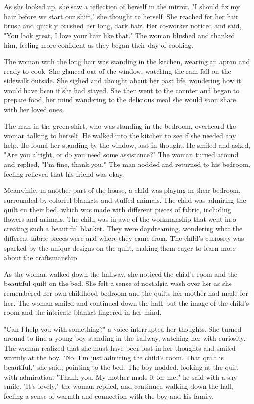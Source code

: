 \documentclass[smalldemyvopaper,11pt,twoside,onecolumn,openright,extrafontsizes]{memoir}
\begin{document}
As she looked up, she saw a reflection of herself in the mirror. "I should fix my hair before we start our shift," she thought to herself. She reached for her hair brush and quickly brushed her long, dark hair. Her co-worker noticed and said, "You look great, I love your hair like that." The woman blushed and thanked him, feeling more confident as they began their day of cooking.\par
The woman with the long hair was standing in the kitchen, wearing an apron and ready to cook. She glanced out of the window, watching the rain fall on the sidewalk outside. She sighed and thought about her past life, wondering how it would have been if she had stayed. She then went to the counter and began to prepare food, her mind wandering to the delicious meal she would soon share with her loved ones.\par
The man in the green shirt, who was standing in the bedroom, overheard the woman talking to herself. He walked into the kitchen to see if she needed any help. He found her standing by the window, lost in thought. He smiled and asked, "Are you alright, or do you need some assistance?" The woman turned around and replied, "I'm fine, thank you." The man nodded and returned to his bedroom, feeling relieved that his friend was okay.\par
Meanwhile, in another part of the house, a child was playing in their bedroom, surrounded by colorful blankets and stuffed animals. The child was admiring the quilt on their bed, which was made with different pieces of fabric, including flowers and animals. The child was in awe of the workmanship that went into creating such a beautiful blanket. They were daydreaming, wondering what the different fabric pieces were and where they came from. The child's curiosity was sparked by the unique designs on the quilt, making them eager to learn more about the craftsmanship.\par
As the woman walked down the hallway, she noticed the child's room and the beautiful quilt on the bed. She felt a sense of nostalgia wash over her as she remembered her own childhood bedroom and the quilts her mother had made for her. The woman smiled and continued down the hall, but the image of the child's room and the intricate blanket lingered in her mind.\par
"Can I help you with something?" a voice interrupted her thoughts. She turned around to find a young boy standing in the hallway, watching her with curiosity. The woman realized that she must have been lost in her thoughts and smiled warmly at the boy. "No, I'm just admiring the child's room. That quilt is beautiful," she said, pointing to the bed. The boy nodded, looking at the quilt with admiration. "Thank you. My mother made it for me," he said with a shy smile. "It's lovely," the woman replied, and continued walking down the hall, feeling a sense of warmth and connection with the boy and his family.\par
\end{document}
